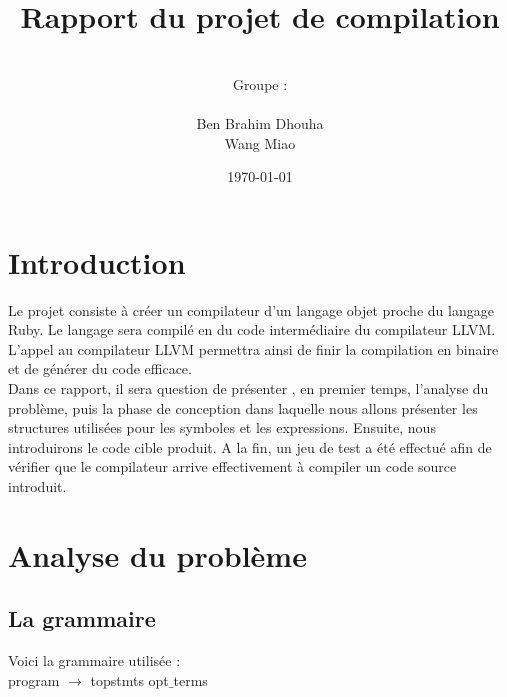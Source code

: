 \documentclass{article}
\date{\vspace{3 cm} \today}
\author{\vspace{4 cm} \\ Groupe :\\ \\Ben Brahim Dhouha\\Wang Miao }
\title{Rapport du projet de compilation \\ }
\begin{document}
\newenvironment{narrow}[2]{%
\begin{list}{}{%
\setlength{\topsep}{0pt}%
\setlength{\leftmargin}{#1}%
\setlength{\rightmargin}{#2}%
\setlength{\listparindent}{\parindent}%
\setlength{\itemindent}{\parindent}%
\setlength{\parsep}{\parskip}%
}%
\item[]}{\end{list}}



\maketitle




\newpage


\section*{Introduction}


Le projet consiste à créer un compilateur d'un langage objet proche du langage Ruby. Le langage sera compilé en du code intermédiaire du compilateur LLVM. L'appel au compilateur LLVM permettra ainsi de finir la compilation en binaire et de générer du code efficace. \\

Dans ce rapport, il sera question de présenter , en premier temps, l'analyse du problème, puis la phase de conception dans laquelle nous allons présenter les structures utilisées pour les symboles et les expressions. Ensuite, nous introduirons le code cible produit.
A la fin, un jeu de test a été effectué afin de vérifier que le compilateur arrive effectivement à compiler un code source introduit.

\newpage
\tableofcontents

\newpage
\section{Analyse du problème}

\subsection{La grammaire}
Voici la grammaire utilisée : \\

\noindent program $\rightarrow$ topstmts opt$\_$terms \\
\end{document}
